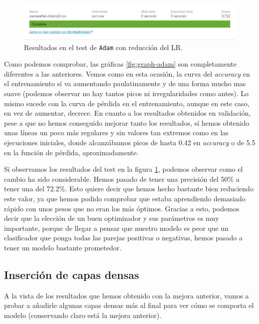 \documentclass[11pt,a4paper]{article}
\begin{document}
\begin{figure}[H]
    \centering
    \includegraphics[scale=0.55]{img/siameseNet-AdamLR.png}
    \caption{Resultados en el test de \texttt{Adam} con reducción del LR.}
    \label{fig:test-adam}
\end{figure}

Como podemos comprobar, las gráficas \ref{fig:graph-adam} son completamente diferentes a las anteriores. Vemos como en
esta ocasión, la curva del \textit{accuracy} en el entrenamiento sí va aumentando paulatinamente y de una forma mucho
mas suave (podemos observar no hay tantos picos ni irregularidades como antes). Lo mismo sucede con la curva de pérdida
en el entrenamiento, aunque en este caso, en vez de aumentar, decrece. En cuanto a los resultados obtenidos en validación,
pese a que no hemos conseguido mejorar tanto los resultados, sí hemos obtenido unas líneas un poco más regulares y sin
valores tan extremos como en las ejecuciones iniciales, donde alcanzábamos picos de hasta 0.42 en \textit{accuracy} o de
5.5 en la función de pérdida, aproximadamente.

Si observamos los resultados del test en la figura \ref{fig:test-adam}, podemos observar como el cambio ha sido considerable.
Hemos pasado de tener una precisión del 50\% a tener una del 72.2\%. Esto quiere decir que hemos hecho bastante
bien reduciendo este valor, ya que hemos podido comprobar que estaba aprendiendo demasiado rápido con unos pesos que no eran
los más óptimos. Gracias a esto, podemos decir que la elección de un buen optimizador y sus parámetros es muy importante,
porque de llegar a pensar que nuestro modelo es peor que un clasificador que ponga todas las parejas positivas o negativas,
hemos pasado a tener un modelo bastante prometedor.


\subsection{Inserción de capas densas}

A la vista de los resultados que hemos obtenido con la mejora anterior, vamos a probar a añadirle algunas capas densas
más al final para ver cómo se comporta el modelo (conservando claro está la mejora anterior).
\end{document}
